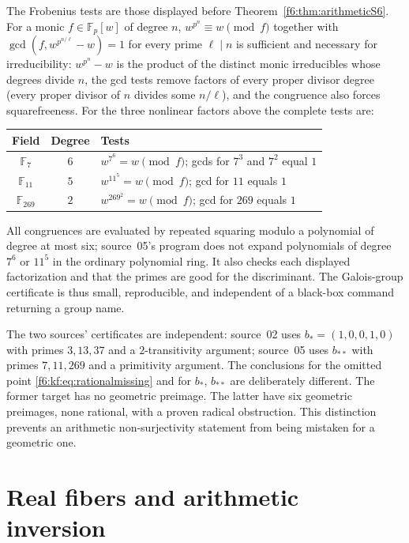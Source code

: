 \documentclass[11pt,a4paper]{article}
\theoremstyle{definition}
\begin{document}
The Frobenius tests are those displayed before
Theorem~\ref{f6:thm:arithmeticS6}. For a monic $f\in\mathbb F_p[w]$ of degree
$n$, $w^{p^n}\equiv w\pmod f$ together with $\gcd(f,w^{p^{n/\ell}}-w)=1$ for
every prime $\ell\mid n$ is sufficient and necessary for irreducibility:
$w^{p^n}-w$ is the product of the distinct monic irreducibles whose degrees
divide $n$, the gcd tests remove factors of every proper divisor degree
(every proper divisor of $n$ divides some $n/\ell$), and the congruence also
forces squarefreeness. For the three nonlinear factors above the complete
tests are:
\begin{center}
\renewcommand{\arraystretch}{1.25}
\begin{tabular}{@{}ccl@{}}
\toprule
Field & Degree & Tests\\
\midrule
$\mathbb F_7$ & $6$ & $w^{7^6}=w\pmod f$; gcds for $7^3$ and $7^2$ equal $1$\\
$\mathbb F_{11}$ & $5$ & $w^{11^5}=w\pmod f$; gcd for $11$ equals $1$\\
$\mathbb F_{269}$ & $2$ & $w^{269^2}=w\pmod f$; gcd for $269$ equals $1$\\
\bottomrule
\end{tabular}
\end{center}
All congruences are evaluated by repeated squaring modulo a polynomial of
degree at most six; source~05's program does not expand polynomials of degree
$7^6$ or $11^5$ in the ordinary polynomial ring. It also checks each displayed
factorization and that the primes are good for the discriminant. The
Galois-group certificate is thus small, reproducible, and independent of a
black-box command returning a group name.

The two sources' certificates are independent: source~02 uses
$b_*=(1,0,0,1,0)$ with primes $3,13,37$ and a $2$-transitivity argument;
source~05 uses $b_{**}$ with primes $7,11,269$ and a primitivity argument.
The conclusions for the omitted point \eqref{f6:kf:eq:rationalmissing} and
for $b_*$, $b_{**}$ are deliberately different. The former target has no
geometric preimage. The latter have six geometric preimages, none rational,
with a proven radical obstruction. This distinction prevents an arithmetic
non-surjectivity statement from being mistaken for a geometric one.

\section{Real fibers and arithmetic inversion}
\label{f6:sec:real}
\end{document}
